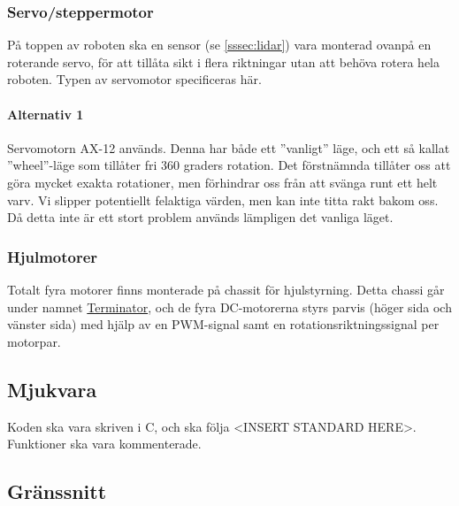 \documentclass[a4paper,11pt]{article}
\begin{document}
\subsubsection{Servo/steppermotor} \label{ssec:servomotor}
På toppen av roboten ska en sensor (se \ref{sssec:lidar}) vara monterad ovanpå en roterande servo, för att tillåta sikt i flera riktningar utan att behöva rotera hela roboten. Typen av servomotor specificeras här.

\paragraph{Alternativ 1}
Servomotorn AX-12 används. Denna har både ett ''vanligt'' läge, och ett så kallat ''wheel''-läge som tillåter fri 360 graders rotation. Det förstnämnda tillåter oss att göra mycket exakta rotationer, men förhindrar oss från att svänga runt ett helt varv. Vi slipper potentiellt felaktiga värden, men kan inte titta rakt bakom oss. Då detta inte är ett stort problem används lämpligen det vanliga läget.

\subsubsection{Hjulmotorer}
Totalt fyra motorer finns monterade på chassit för hjulstyrning. Detta chassi går under namnet \href{https://docs.isy.liu.se/pub/VanHeden/DataSheets/terminator_prel.pdf}{Terminator}, och de fyra DC-motorerna styrs parvis (höger sida och vänster sida) med hjälp av en PWM-signal samt en rotationsriktningssignal per motorpar.

\subsection{Mjukvara}

Koden ska vara skriven i C, och ska följa <INSERT STANDARD HERE>. Funktioner ska vara kommenterade.

\subsection{Gränssnitt} \label{ssec:controllInterface}
\end{document}
